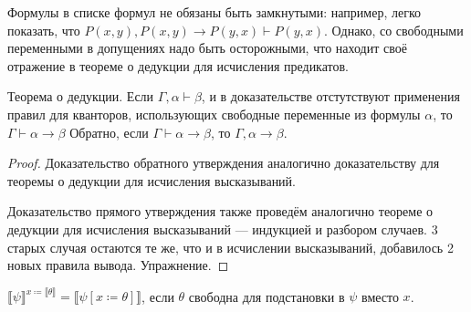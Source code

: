 Формулы в списке формул не обязаны быть замкнутыми: например, легко 
показать, что $P(x,y), P(x,y)\rightarrow P(y,x) \vdash P(y,x)$. Однако,
со свободными переменными в допущениях надо быть осторожными, что 
находит своё отражение в теореме о дедукции для исчисления предикатов.

\begin{theorem}
Теорема о дедукции. Если $\Gamma, \alpha \vdash \beta$, 
и в доказательстве отстутствуют применения правил для кванторов, использующих
свободные переменные из формулы $\alpha$, то $\Gamma \vdash \alpha \rightarrow \beta$
Обратно, если $\Gamma \vdash \alpha\rightarrow\beta$, то $\Gamma,\alpha\rightarrow\beta$.
\end{theorem}

\begin{proof}
Доказательство обратного утверждения аналогично доказательству для теоремы о дедукции
для исчисления высказываний.

Доказательство прямого утверждения также проведём аналогично теореме о дедукции 
для исчисления высказываний --- индукцией и разбором случаев. 
3 старых случая остаются те же, что и в исчислении высказываний, 
добавилось 2 новых правила вывода. Упражнение.
\end{proof}

\begin{lemma}\label{free_substitution}
$\llbracket \psi \rrbracket^{x \coloneqq  \llbracket\theta\rrbracket} = \llbracket \psi[x \coloneqq  \theta] \rrbracket$,
если $\theta$ свободна для подстановки в $\psi$ вместо $x$.
\end{lemma}

